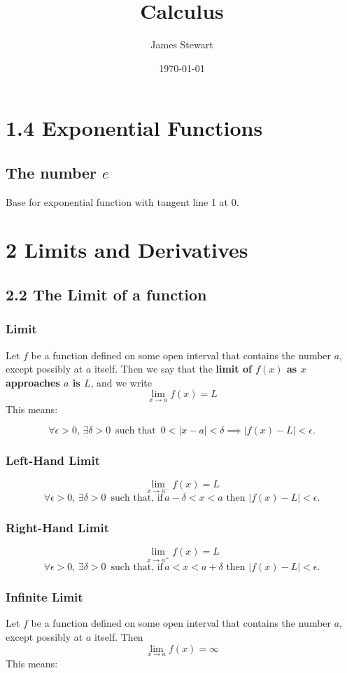 \documentclass{article}
\title{Calculus}
\author{James Stewart}
\date{\today}
\begin{document}
\maketitle %

\section*{1.4 Exponential Functions}
\subsection*{The number \( e \)}
Base for exponential function with tangent line 1 at 0.
\section*{2 Limits and Derivatives}
\subsection*{2.2 The Limit of a function}
\subsubsection*{Limit} 
Let \(f\) be a function defined on some open interval that contains the number \(a\), except possibly at \(a\) itself. Then we say that
the \textbf{limit of \( f(x) \) as \(x\) approaches \(a\) is \(L\)}, and we write
\[
\lim_{x \to a} f(x) = L
\]
This means:

\[
\forall \epsilon > 0, \, \exists \delta > 0 \, \text{ such that } \, 0 < |x - a| < \delta \implies |f(x) - L| < \epsilon.
\]

\subsubsection*{Left-Hand Limit} 
\[
\lim_{x \to a^-} f(x) = L
\]
\[
\forall \epsilon > 0, \, \exists \delta > 0 \, \text{ such that, if} \, a - \delta < x < a \text{ then } |f(x) - L| < \epsilon.
\]

\subsubsection*{Right-Hand Limit} 
\[
\lim_{x \to a^+} f(x) = L
\]
\[
\forall \epsilon > 0, \, \exists \delta > 0 \, \text{ such that, if} \, a < x < a + \delta \text{ then } |f(x) - L| < \epsilon.
\]

\subsubsection*{Infinite Limit} 
Let \(f\) be a function defined on some open interval that contains the number \(a\), except possibly at \(a\) itself. Then 
\[
\lim_{x \to a} f(x) = \infty
\]
This means:
\end{document}
